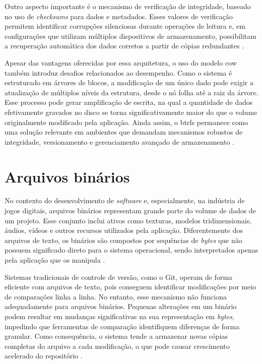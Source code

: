 Outro aspecto importante é o mecanismo de verificação de integridade, baseado no uso de \textit{checksums} para dados e metadados. Esses valores de verificação permitem identificar corrupções silenciosas durante operações de leitura e, em configurações que utilizam múltiplos dispositivos de armazenamento, possibilitam a recuperação automática dos dados corretos a partir de cópias redundantes \cite{Chen2014}.

Apesar das vantagens oferecidas por essa arquitetura, o uso do modelo \gls{cow} também introduz desafios relacionados ao desempenho. Como o sistema é estruturado em árvores de blocos, a modificação de um único dado pode exigir a atualização de múltiplos níveis da estrutura, desde o nó folha até a raiz da árvore. Esse processo pode gerar amplificação de escrita, na qual a quantidade de dados efetivamente gravados no disco se torna significativamente maior do que o volume originalmente modificado pela aplicação. Ainda assim, o \gls{btrfs} permanece como uma solução relevante em ambientes que demandam mecanismos robustos de integridade, versionamento e gerenciamento avançado de armazenamento \cite{Chen2014}.

\section{Arquivos binários}

No contexto do desenvolvimento de \textit{software} e, especialmente, na indústria de jogos digitais, arquivos binários representam grande parte do volume de dados de um projeto. Esse conjunto inclui ativos como texturas, modelos tridimensionais, áudios, vídeos e outros recursos utilizados pela aplicação. Diferentemente dos arquivos de texto, os binários são compostos por sequências de \textit{bytes} que não possuem significado direto para o sistema operacional, sendo interpretados apenas pela aplicação que os manipula \cite{Houston2019}.

Sistemas tradicionais de controle de versão, como o Git, operam de forma eficiente com arquivos de texto, pois conseguem identificar modificações por meio de comparações linha a linha. No entanto, esse mecanismo não funciona adequadamente para arquivos binários. Pequenas alterações em um binário podem resultar em mudanças significativas na sua representação em \textit{bytes}, impedindo que ferramentas de comparação identifiquem diferenças de forma granular. Como consequência, o sistema tende a armazenar novas cópias completas do arquivo a cada modificação, o que pode causar crescimento acelerado do repositório \cite{Chen2025}.

